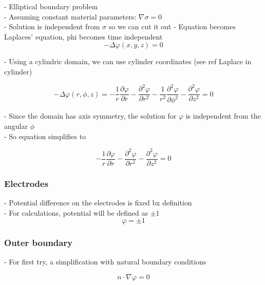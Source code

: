 \documentclass[parskip=half, titlepage=yes, 12pt, BCOR=12mm, DIV=calc]{scrartcl}
\begin{document}
- Elliptical boundary problem \\
- Assuming constant material parameters: $\nabla \sigma = 0$ \\
- Solution is independent from $\sigma$ so we can cut it out
- Equation becomes Laplaces' equation, phi becomes time independent \\

\begin{equation}
    - \Delta \varphi(x,y,z) = 0
\end{equation}

- Using a cylindric domain, we can use cylinder coordinates (see ref Laplace in cylinder)

\begin{equation}
    - \Delta \varphi(r,\phi,z) = - \frac{1}{r} \frac{\partial \varphi}{\partial r} - \frac{\partial^2 \varphi}{\partial r^2} - \frac{1}{r^2} \frac{\partial^2 \varphi}{\partial \phi^2} -      \frac{\partial^2 \varphi}{\partial z^2}  = 0
\end{equation}

- Since the domain has axis symmetry, the solution for $\varphi$ is independent from the angular $\phi$ \\
- So equation simplifies to 

\begin{equation}
    - \frac{1}{r} \frac{\partial \varphi}{\partial r} - \frac{\partial^2 \varphi}{\partial r^2} - \frac{\partial^2 \varphi}{\partial z^2} = 0
\end{equation}


\subsubsection{Electrodes}

- Potential difference on the electrodes is fixed bx definition \\
- For calculations, potential will be defined as $\pm 1$ \\

\begin{equation}
    \varphi = \pm 1
\end{equation}


\subsubsection{Outer boundary}

- For first try, a simplification with natural boundary conditions

\begin{equation}
    n \cdot \nabla \varphi = 0
\end{equation}
\end{document}

